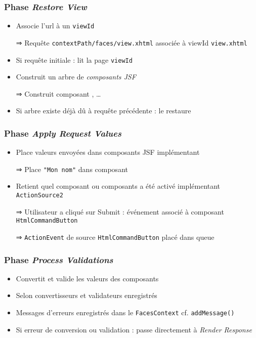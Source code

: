 \documentclass[english, french]{beamer}
\begin{document}
\begin{frame}[label=ph-rv]
	\frametitle{Phase \emph{Restore View}}
	\begin{itemize}
		\item Associe l’url à un \texttt{viewId}
		\item[⇒] Requête \texttt{contextPath/faces/view.xhtml} associée à viewId \texttt{view.xhtml}
		\item Si requête initiale : lit la page \texttt{viewId}
		\item Construit un arbre de \emph{composants JSF}
		\item[⇒] Construit composant , …
		\item Si arbre existe déjà dû à requête précédente : le restaure
	\end{itemize}
\end{frame}

\begin{frame}[label=ph-arv]
	\frametitle{Phase \emph{Apply Request Values}}
	\begin{itemize}
		\item Place valeurs envoyées dans composants JSF {\tiny implémentant }
		\item[⇒] Place \texttt{"Mon nom"} dans composant 
		\item Retient quel composant {\tiny ou composants} a été activé {\tiny implémentant \texttt{ActionSource2}}
		\item[⇒] Utilisateur a cliqué sur \og{}Submit\fg{} : événement associé à composant \texttt{HtmlCommandButton}
		\item[⇒] {\tiny \texttt{ActionEvent} de source \texttt{HtmlCommandButton} placé dans queue}
	\end{itemize}
\end{frame}

\begin{frame}
	\frametitle{Phase \emph{Process Validations}}
	\begin{itemize}
		\item Convertit et valide les valeurs des composants
		\item Selon convertisseurs et validateurs enregistrés
		\item Messages d’erreurs enregistrés dans le \texttt{FacesContext} {\tiny cf. \texttt{addMessage()}}
		\item Si erreur de conversion ou validation : passe directement à \emph{Render Response}
	\end{itemize}
\end{frame}
\end{document}
